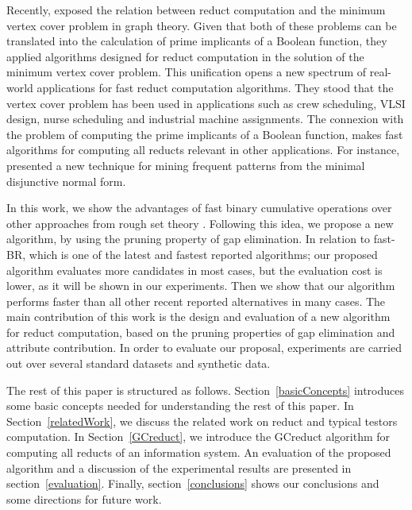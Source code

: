 \documentclass[authoryear,preprint,review,12pt]{elsarticle}
\begin{document}
  Recently, \cite{chen2015} exposed the relation between reduct computation and the minimum vertex cover
  problem in graph theory. Given that both of these problems can be translated into the calculation of
  prime implicants of a Boolean function, they applied algorithms designed for reduct computation in the
  solution of the minimum vertex cover problem. This unification opens a new spectrum of real-world applications
  for fast reduct computation algorithms. They stood that the vertex cover problem has been used in applications 
  such as crew scheduling, VLSI design, nurse scheduling and industrial machine assignments.
  The connexion with the problem of computing the prime implicants of a Boolean function, makes fast 
  algorithms for computing all reducts relevant in other applications. For instance, \cite{Li2015} presented a new technique for mining frequent patterns from the minimal disjunctive normal form.

  In this work, we show the advantages of fast binary cumulative operations \citep{Sanchez10,Lias13} over other 
  approaches from rough set theory \citep{WangP07,Jensen14}. Following this idea, we propose a new algorithm, by using the pruning property of gap elimination. In relation to fast-BR, which is one of the latest and fastest reported algorithms; our proposed algorithm evaluates more candidates in most cases, but the evaluation cost is lower, as it will be shown in our experiments. Then we show that our algorithm performs faster than all other recent reported alternatives in
  many cases. 
  The main contribution of this work is the design and evaluation of a new algorithm for reduct computation,
  based on  the pruning properties of gap elimination and attribute contribution. In order to evaluate our proposal, experiments are carried out over several standard datasets \citep{Bache13} and synthetic data.
  
  The rest of this paper is structured as follows. Section~\ref{basicConcepts}  introduces some basic concepts needed for understanding the rest of this paper. In Section~\ref{relatedWork}, we discuss the related work on reduct and typical testors computation.  In Section~\ref{GCreduct}, we introduce the GCreduct algorithm for computing all reducts of an information system. An evaluation of the proposed algorithm and a discussion of the experimental results are presented in section~\ref{evaluation}. Finally, section~\ref{conclusions} shows our conclusions and some directions for future work.
   
\end{document}
